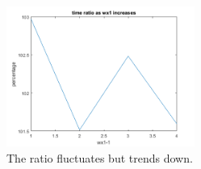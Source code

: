 \documentclass[12pt]{article}
\begin{document}
\begin{problem}[1]
\begin{enumerate}[label=(\alph*)]
~\begin{figure}[H]
	\centering
	\includegraphics[width=0.55\textwidth]{./figures/6.15.png}
	\caption{The ratio fluctuates but trends down.}
\end{figure}

\end{enumerate}
\end{problem}
\end{document}

